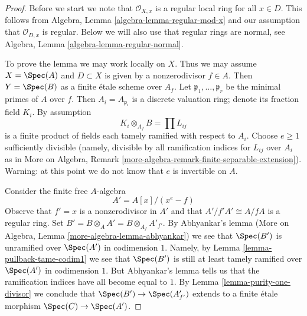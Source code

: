 \begin{proof}
Before we start we note that $\mathcal{O}_{X, x}$ is a regular
local ring for all $x \in D$. This follows from
Algebra, Lemma \ref{algebra-lemma-regular-mod-x}
and our assumption that $\mathcal{O}_{D, x}$ is regular.
Below we will also use that regular rings are normal, see
Algebra, Lemma \ref{algebra-lemma-regular-normal}.

\medskip\noindent
To prove the lemma we may work locally on $X$.
Thus we may assume $X = \Spec(A)$ and $D \subset X$
is given by a nonzerodivisor $f \in A$.
Then $Y = \Spec(B)$ as a finite \'etale scheme over $A_f$.
Let $\mathfrak p_1, \ldots, \mathfrak p_r$ be the minimal
primes of $A$ over $f$. Then $A_i = A_{\mathfrak p_i}$
is a discrete valuation ring; denote its fraction field $K_i$.
By assumption
$$
K_i \otimes_{A_f} B = \prod L_{ij}
$$
is a finite product of fields each tamely ramified with respect to $A_i$.
Choose $e \geq 1$ sufficiently divisible (namely, divisible by
all ramification indices for $L_{ij}$ over $A_i$ as in
More on Algebra, Remark \ref{more-algebra-remark-finite-separable-extension}).
Warning: at this point we do not know that $e$ is invertible on $A$.

\medskip\noindent
Consider the finite free $A$-algebra
$$
A' = A[x]/(x^e - f)
$$
Observe that $f' = x$ is a nonzerodivisor in $A'$ and that
$A'/f'A' \cong A/fA$ is a regular ring. Set
$B' = B \otimes_A A' = B \otimes_{A_f} A'_{f'}$.
By Abhyankar's lemma
(More on Algebra, Lemma \ref{more-algebra-lemma-abhyankar})
we see that $\Spec(B')$ is unramified over $\Spec(A')$
in codimension $1$. Namely, by Lemma \ref{lemma-pullback-tame-codim1}
we see that $\Spec(B')$ is still at least tamely ramified
over $\Spec(A')$ in codimension $1$. But Abhyankar's lemma
tells us that the ramification indices have all become equal to $1$.
By Lemma \ref{lemma-purity-one-divisor} we conclude that
$\Spec(B') \to \Spec(A'_{f'})$ extends to a finite \'etale morphism
$\Spec(C) \to \Spec(A')$.


\end{proof}
